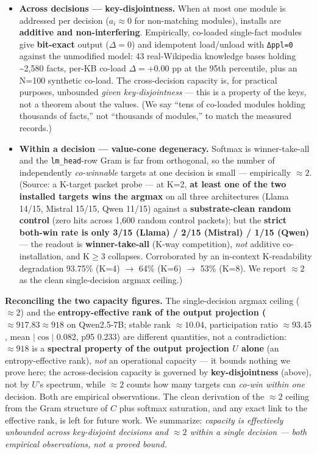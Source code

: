 \documentclass[11pt]{article}
\theoremstyle{plain}
\theoremstyle{definition}
\begin{document}
\begin{itemize}
\item \textbf{Across decisions — key-disjointness.} When at most one module is addressed per decision ($a_i \approx 0$ for non-matching modules), installs are \textbf{additive and non-interfering}. Empirically, co-loaded single-fact modules give \textbf{bit-exact} output ($\Delta = 0$) and idempotent load/unload with \texttt{Δppl=0} against the unmodified model: 43 real-Wikipedia knowledge bases holding \textasciitilde{}2,580 facts, per-KB co-load $\Delta = +0.00$ pp at the 95th percentile, plus an N=100 synthetic co-load. The cross-decision capacity is, for practical purposes, unbounded \emph{given key-disjointness} — this is a property of the keys, not a theorem about the values. (We say ``tens of co-loaded modules holding thousands of facts,'' not ``thousands of modules,'' to match the measured records.)

\item \textbf{Within a decision — value-cone degeneracy.} Softmax is winner-take-all and the \texttt{lm\_head}-row Gram is far from orthogonal, so the number of independently \emph{co-winnable} targets at one decision is small — empirically \textbf{$\approx 2$}. (Source: a K-target packet probe — at K=2, \textbf{at least one of the two installed targets wins the argmax} on all three architectures (Llama 14/15, Mistral 15/15, Qwen 11/15) against a \textbf{substrate-clean random control} (zero hits across 1,600 random control packets); but the \textbf{strict both-win rate is only 3/15 (Llama) / 2/15 (Mistral) / 1/15 (Qwen)} — the readout is \textbf{winner-take-all} (K-way competition), \emph{not} additive co-installation, and K$\ge$3 collapses. Corroborated by an in-context K-readability degradation 93.75\% (K=4) $\to$ 64\% (K=6) $\to$ 53\% (K=8). We report $\approx 2$ as the clean single-decision argmax ceiling.)
\end{itemize}

\textbf{Reconciling the two capacity figures.} The single-decision argmax ceiling ($\approx 2$) and the \textbf{entropy-effective rank of the output projection ($\approx 917.83 \approx 918$} on Qwen2.5-7B; stable rank $\approx 10.04$, participation ratio $\approx 93.45$, mean $|\cos|$ 0.082, p95 0.233) are different quantities, not a contradiction: $\approx 918$ is a \textbf{spectral property of the output projection $U$ alone} (an entropy-effective rank), \emph{not} an operational capacity — it bounds nothing we prove here; the across-decision capacity is governed by \textbf{key-disjointness} (above), not by $U$'s spectrum, while $\approx 2$ counts how many targets can \emph{co-win within one} decision. Both are empirical observations. The clean derivation of the $\approx 2$ ceiling from the Gram structure of $C$ plus softmax saturation, and any exact link to the effective rank, is left for future work. We summarize: \emph{capacity is effectively unbounded across key-disjoint decisions and $\approx 2$ within a single decision — both empirical observations, not a proved bound.}
\end{document}
